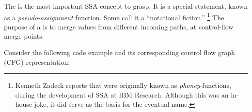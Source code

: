 The \phifun\index{\phifun} is the most important SSA concept to grasp.
It is a special statement, known as a
\textit{pseudo-assignment} function.
Some call it a ``notational fiction.''
\footnote{
%
%
Kenneth Zadeck reports that \phifuns were originally
known as \textit{phoney}-functions, during the development
of SSA at IBM Research. Although this was an in-house joke,
it did serve as the basis for the eventual name.
}
The purpose of a \phifun{} is to merge
values from different incoming paths, at control-flow
merge points.

Consider the following code example and its corresponding control flow graph (CFG) representation:

